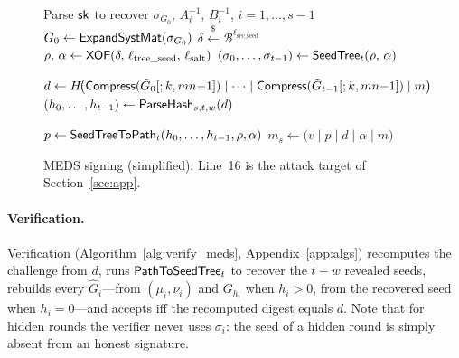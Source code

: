\begin{figure}[htbp]
\centering
\begin{algorithm}[H]
\small
\setlength{\algomargin}{1.2em}
\caption{MEDS signing (simplified). Line~16 is the attack target of
Section~\ref{sec:app}.}
\label{alg:sign_meds}

Parse $\mathsf{sk}$ to recover $\sigma_{G_0}$, $A_i^{-1}$, $B_i^{-1}$, $i=1,\ldots,s-1$\;
$G_0 \leftarrow \mathsf{ExpandSystMat}(\sigma_{G_0})$\;
$\delta \xleftarrow{\$} \mathcal{B}^{\ell_{\mathrm{sec\_seed}}}$\;
$\rho,\, \alpha \leftarrow \mathsf{XOF}(\delta,\, \ell_{\mathrm{tree\_seed}},\, \ell_{\mathrm{salt}})$\;
$(\sigma_0, \ldots, \sigma_{t-1}) \leftarrow \mathsf{SeedTree}_t(\rho,\, \alpha)$


$d \leftarrow H\!\bigl(\mathsf{Compress}(\tilde{G}_0[;k,mn{-}1]) \mid \cdots
 \mid \mathsf{Compress}(\tilde{G}_{t-1}[;k,mn{-}1]) \mid m\bigr)$\;
$(h_0,\ldots,h_{t-1}) \leftarrow \mathsf{ParseHash}_{s,t,w}(d)$


$p \leftarrow \mathsf{SeedTreeToPath}_t(h_0,\ldots,h_{t-1},\rho,\alpha)$
\Return $m_s \leftarrow \bigl(v \mid p \mid d \mid \alpha \mid m\bigr)$
\end{algorithm}
\end{figure}

\paragraph{Verification.}
Verification (Algorithm~\ref{alg:verify_meds}, Appendix~\ref{app:algs})
recomputes the challenge from $d$, runs $\mathsf{PathToSeedTree}_t$ to recover the
$t-w$ revealed seeds, rebuilds every $\hat{G}_i$---from $(\mu_i,\nu_i)$ and
$G_{h_i}$ when $h_i > 0$, from the recovered seed when $h_i = 0$---and accepts
iff the recomputed digest equals $d$. Note that for hidden rounds the verifier
never uses $\sigma_i$: the seed of a hidden round is simply absent from an
honest signature.

